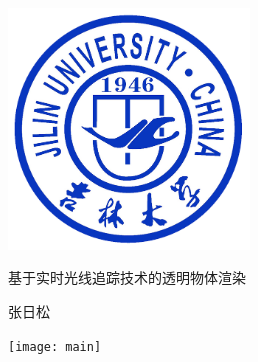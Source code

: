 \documentclass[UTF8, zihao = -4]{ctexart}
\newlength{\colpad}
\newcommand{\colwidth}{0.99\ccwd}
\newcommand{\miniwidth}{210mm}
\newcommand{\logowidth}{64mm}
\newcommand{\vertmargin}{\fill}
\begin{document}
\centering
\begin{minipage}[b][\textheight][b]{\miniwidth}
	\vspace*{\fill}\par
	\centerline{\includegraphics[width = \logowidth]{jlu.png}}\par
	\vspace*{\fill}\par
\end{minipage}
\hspace{\colpad}
\begin{minipage}[b][\textheight][b]{\colwidth}
	\bfseries\linespread{1}\selectfont
	\vspace*{\vertmargin}\par
	基于实时光线追踪技术的透明物体渲染\par\vfill
	张日松\par{}\par	%
	\vspace*{\vertmargin}\par
\end{minipage}
\hspace{\colpad}
\begin{minipage}[b][\textheight][b]{\miniwidth}
	\texttt{[image: main]}
\end{minipage}
\end{document}
